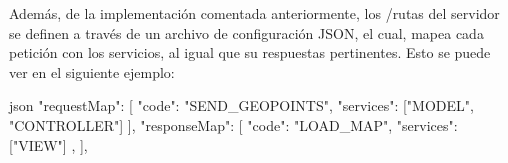 Además, de la implementación comentada anteriormente, los /rutas del servidor se definen a través de un archivo de configuración JSON, el cual, mapea cada petición con los servicios, al igual que su respuestas pertinentes. Esto se puede ver en el siguiente ejemplo:

\begin{code}{\scriptsize}{json}
{
  "requestMap": [
    {
      "code": "SEND_GEOPOINTS",
      "services": ["MODEL", "CONTROLLER"]
    }
  ],
  "responseMap": [
    {
      "code": "LOAD_MAP",
      "services": ["VIEW"]
    },
  ],
}
\end{code}
